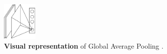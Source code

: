 \begin{figure}[H]
    \centering
    \includegraphics[width=0.15\textwidth]{fig/rel/images/gap_fix.pdf}
    \caption{\textbf{Visual representation} of Global Average Pooling \autocite{lin2013network}.}
    \label{fig:rel_gap}
\end{figure}